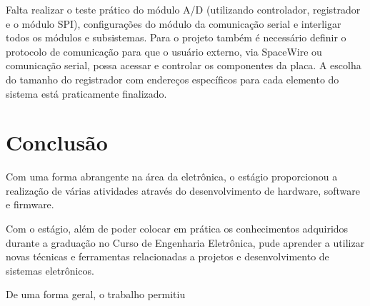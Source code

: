 \documentclass[
	12pt,				%
	openright,			%
	twoside,			%
	a4paper,			%
	english,			%
	french,				%
	spanish,			%
	brazil				%
	]{abntex2}
\begin{document}
Falta realizar o teste prático do módulo A/D (utilizando controlador, registrador e o módulo SPI), configurações do módulo da comunicação serial e interligar todos os módulos e subsistemas. Para o projeto também é necessário definir o protocolo de comunicação para que o usuário externo, via SpaceWire ou comunicação serial, possa acessar e controlar os componentes da placa. A escolha do tamanho do registrador com endereços específicos para cada elemento do sistema está praticamente finalizado.


\chapter{Conclusão}

Com uma forma abrangente na área da eletrônica, o estágio proporcionou a realização de várias atividades através do desenvolvimento de hardware, software e firmware.

Com o estágio, além de poder colocar em prática os conhecimentos adquiridos durante a graduação no Curso de Engenharia Eletrônica, pude aprender a utilizar novas técnicas e ferramentas relacionadas a projetos e desenvolvimento de sistemas eletrônicos.

De uma forma geral, o trabalho permitiu









\postextual



%
%

\end{document}

